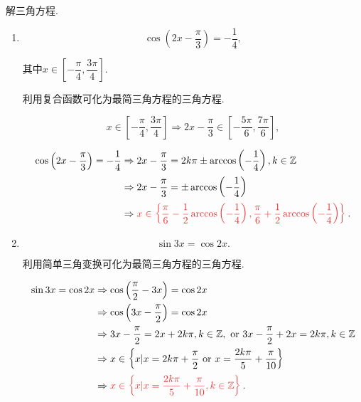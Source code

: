 \documentclass[8pt]{article}
\begin{document}
		解三角方程.
			\begin{enumerate}[label=\defmath{(\arabic*)}]
				\item \[\cos \left(2x - \dfrac{\pi}{3}\right) = -\dfrac{1}{4},\]

					其中\(x \in \left[-\dfrac{\pi}{4}, \dfrac{3\pi}{4}\right]\). 

					利用复合函数可化为最简三角方程的三角方程.

					\[x \in \left[-\dfrac{\pi}{4}, \dfrac{3\pi}{4}\right] \Rightarrow 2x-\dfrac{\pi}{3} \in \left[-\dfrac{5\pi}{6}, \dfrac{7\pi}{6}\right],\]

					\begin{align*}
						\cos \left(2x - \dfrac{\pi}{3}\right) = -\dfrac{1}{4} &\Rightarrow 2x-\frac{\pi}{3} = 2k\pi \pm \arccos \left(-\dfrac{1}{4}\right), k \in \ZZ\\
						&\Rightarrow 2x - \dfrac{\pi}{3} = \pm \arccos \left(-\dfrac{1}{4}\right)\\
						&\Rightarrow \ansmath{x \in \left\{\dfrac{\pi}{6} - \dfrac{1}{2} \arccos \left(-\dfrac{1}{4}\right), \dfrac{\pi}{6} + \dfrac{1}{2} \arccos \left(-\dfrac{1}{4}\right)\right\}}.
					\end{align*}

				\item \[\sin 3x = \cos 2x.\]


					利用简单三角变换可化为最简三角方程的三角方程.

					\begin{align*}
						\sin 3x = \cos 2x &\Rightarrow \cos \left(\frac{\pi}{2} - 3x\right) = \cos 2x\\
						&\Rightarrow \cos \left(3x - \dfrac{\pi}{2}\right) = \cos 2x\\
						&\Rightarrow 3x - \frac{\pi}{2} = 2x + 2k\pi, k\in \ZZ, \lgor 3x - \frac{\pi}{2} + 2x = 2k\pi, k \in \ZZ\\
						&\Rightarrow x \in \left\{x|x=2k\pi + \frac{\pi}{2} \lgor x = \frac{2k\pi}{5}  + \frac{\pi}{10}\right\}\\
						&\Rightarrow \ansmath{x \in \left\{x|x = \frac{2k\pi}{5} + \frac{\pi}{10}, k\in \ZZ\right\}}.
					\end{align*}

			\end{enumerate}
		~\\
\end{document}
